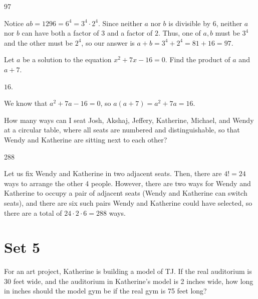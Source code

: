 \documentclass[11pt]{article}
\begin{document}
\begin{answer}
97
\end{answer}

\begin{solution}
Notice $ab = 1296 = 6^4 = 3^4 \cdot 2^4$. Since neither $a$ nor $b$ is divisible by $6$, neither $a$ nor $b$ can have both a factor of $3$ and a factor of $2$. Thus, one of $a,b$ must be $3^4$ and the other must be $2^4$, so our answer is $a+b = 3^4 + 2^4 = 81 + 16 = \boxed{97}$.
\end{solution}


\begin{problem}
Let $a$ be a solution to the equation $x^2 + 7x - 16 = 0$. Find the product of $a$ and $a+7$.
\end{problem}

\begin{answer}
$\boxed{16}$.
\end{answer}

\begin{solution}
We know that $a^2 + 7a - 16 = 0$, so $a(a+7) = a^2 + 7a = \boxed{16}$.
\end{solution}


\begin{problem}
How many ways can I seat Josh, Akshaj, Jeffery, Katherine, Michael, and Wendy at a circular table, where all seats are numbered
and distinguishable, so that Wendy and Katherine are sitting next to each other?
\end{problem}

\begin{answer}
288
\end{answer}

\begin{solution}
Let us fix Wendy and Katherine in two adjacent seats. Then, there are $4!=24$ ways to arrange the other 4 people. However, there are two ways for Wendy and Katherine to occupy a pair of adjacent seats (Wendy and Katherine can switch seats), and there are six such pairs Wendy and Katherine could have selected, so there are a total of $24 \cdot 2 \cdot 6 = \boxed{288}$ ways.
\end{solution}


\newpage
\section*{Set 5}
\begin{problem}
For an art project, Katherine is building a model of TJ. If the real auditorium is 30 feet wide, and the auditorium in Katherine's model is
2 inches wide, how long in inches should the model gym be if the real gym is 75 feet long?
\end{problem}
\end{document}
